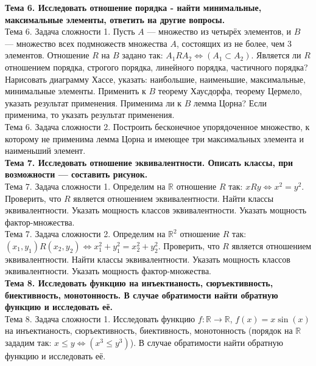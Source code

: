 \documentclass[12pt,oneside]{article}
\theoremstyle{definition}
\begin{document}
{\bf Тема 6. Исследовать отношение порядка - найти минимальные, максимальные элементы, ответить на другие вопросы.}\\

Тема 6. Задача сложности 1. Пусть $A$ --- множество из четырёх элементов, и $B$ --- множество всех подмножеств множества $A$, состоящих из не более, чем 3 элементов. Отношение $R$ на $B$ задано так: $A_1RA_2\iff(A_1\subset A_2)$. Является ли $R$ отношением порядка, строгого порядка, линейного порядка, частичного порядка? Нарисовать диаграмму Хассе, указать: наибольшие, наименьшие, максимальные, минимальные элементы. Применить к $B$ теорему Хаусдорфа, теорему Цермело, указать результат применения. Применима ли к $B$ лемма Цорна? Если применима, то указать результат применения.\\

Тема 6. Задача сложности 2. Построить бесконечное упорядоченное множество, к которому не применима лемма Цорна и имеющее три максимальных элемента и наименьший элемент.\\

{\bf Тема 7. Исследовать отношение эквивалентности. Описать классы, при возможности --- составить рисунок.}\\

Тема 7. Задача сложности 1. Определим на $\mathbb{R}$ отношение $R$ так: $xRy\iff x^2=y^2$. Проверить, что $R$ является отношением эквивалентности. Найти классы эквивалентности. Указать мощность классов эквивалентности. Указать мощность фактор-множества.\\

Тема 7. Задача сложности 2. Определим на $\mathbb{R}^2$ отношение $R$ так: $(x_1,y_1)R(x_2,y_2)\iff x_1^2+y_1^2=x_2^2+y_2^2$. Проверить, что $R$ является отношением эквивалентности. Найти классы эквивалентности. Указать мощность классов эквивалентности. Указать мощность фактор-множества.\\


{\bf Тема 8. Исследовать функцию на инъектианость, сюръективность, биективность, монотонность. В случае обратимости найти обратную функцию и исследовать её.}\\

Тема 8. Задача сложности 1. Исследовать функцию $f\colon \mathbb{R}\to \mathbb{R}$, $f(x)=x\sin(x)$ на инъектианость, сюръективность, биективность, монотонность (порядок на $\mathbb{R}$ зададим так: $x\leq y\iff (x^3\leq y^3)$). В случае обратимости найти обратную функцию и исследовать её.\\
\end{document}
